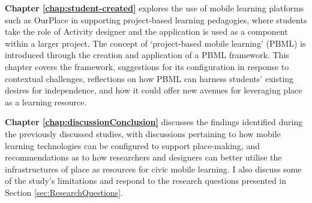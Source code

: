 \textbf{Chapter \ref{chap:student-created}} explores the use of mobile learning platforms such as OurPlace in supporting project-based learning pedagogies, where students take the role of Activity designer and the application is used as a component within a larger project. The concept of `project-based mobile learning' (PBML) is introduced through the creation and application of a PBML framework. This chapter covers the framework, suggestions for its configuration in response to contextual challenges, reflections on how PBML can harness students’ existing desires for independence, and how it could offer new avenues for leveraging place as a learning resource. 

\textbf{Chapter \ref{chap:discussionConclusion}} discusses the findings identified during the previously discussed studies, with discussions pertaining to how mobile learning technologies can be configured to support place-making, and recommendations as to how researchers and designers can better utilise the infrastructures of place as resources for civic mobile learning. I also discuss some of the study’s limitations and respond to the research questions presented in Section \ref{sec:ResearchQuestions}.